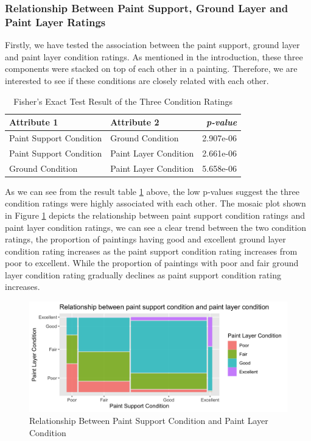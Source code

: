 \documentclass[11pt, oneside]{article}
\begin{document}
\subsubsection{Relationship Between Paint Support, Ground Layer and Paint Layer Ratings}
Firstly, we have tested the association between the paint support, ground layer and paint layer condition ratings. As mentioned in the introduction, these three components were stacked on top of each other in a painting. Therefore, we are interested to see if these conditions are closely related with each other.
\begin{table}[H]
\begin{center}
\begin{tabular}{llr}
\hline
 Attribute 1 & Attribute 2 & \textit{p-value} \\
\hline
Paint Support Condition & Ground Condition  & 2.907e-06  \\
\hline
Paint Support Condition & Paint Layer Condition & 2.661e-06  \\
\hline
Ground Condition & Paint Layer Condition & 5.658e-06  \\
\hline
\end{tabular}
\end{center}
\caption{Fisher's Exact Test Result of the Three Condition Ratings}
\label{three-cond}
\end{table}
\noindent As we can see from the result table \ref{three-cond} above, the low p-values suggest the three condition ratings were highly associated with each other. The mosaic plot shown in Figure \ref{ps_pl_mosaic} depicts the relationship between paint support condition ratings and paint layer condition ratings, we can see a clear trend between the two condition ratings, the proportion of paintings having good and excellent ground layer condition rating increases as the paint support condition rating increases from poor to excellent. While the proportion of paintings with poor and fair ground layer condition rating gradually declines as paint support condition rating increases.

\begin{figure}[H]
    \centering
    \includegraphics[scale=0.19]{images/ps_pl_mosaic.png}
    \caption{Relationship Between Paint Support Condition and Paint Layer Condition}
    \label{ps_pl_mosaic}
\end{figure}
\end{document}
